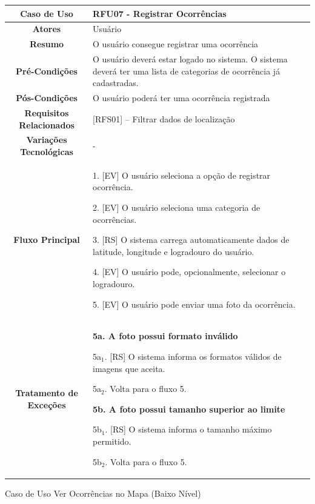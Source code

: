 \begin{apendicesenv}
\begin{quadro}[htb]
	\begin{tabular}{|c|p{11cm}|}
		\hline
		\textbf{Caso de Uso} & RFU07 - Registrar Ocorrências \\ \hline
		\textbf{Atores} & Usuário \\ \hline
		\textbf{Resumo} & O usuário consegue registrar uma ocorrência \\ \hline
		\textbf{Pré-Condições} & O usuário deverá estar logado no sistema. O sistema deverá ter uma lista de categorias de ocorrência já cadastradas. \\ \hline
		\textbf{Pós-Condições} & O usuário poderá ter uma ocorrência registrada \\ \hline
		\textbf{Requisitos Relacionados} & [RFS01] -- Filtrar dados de localização \\ \hline
		\textbf{Variações Tecnológicas} & - \\ \hline
		
		\textbf{Fluxo Principal} &
		\parbox[t]{11cm}{
			\raggedright
			1. [EV] O usuário seleciona a opção de registrar ocorrência.\par
			2. [EV] O usuário seleciona uma categoria de ocorrências.\par
			3. [RS] O sistema carrega automaticamente dados de latitude, longitude e logradouro do usuário.\par
			4. [EV] O usuário pode, opcionalmente, selecionar o logradouro.\par
			5. [EV] O usuário pode enviar uma foto da ocorrência.
		}
		\\ \hline
		
		\textbf{Tratamento de Exceções} &
		\parbox[t]{11cm}{
			\raggedright
			\textbf{5a. A foto possui formato inválido}\par
			5a$_1$. [RS] O sistema informa os formatos válidos de imagens que aceita.\par
			5a$_2$. Volta para o fluxo 5.\par
			
			\textbf{5b. A foto possui tamanho superior ao limite}\par
			5b$_1$. [RS] O sistema informa o tamanho máximo permitido.\par
			5b$_2$. Volta para o fluxo 5.
		}
		\\ \hline
	\end{tabular}
	
\end{quadro}

\begin{quadro}[htb]
	\centering
	\caption{\label{quadro_rfu08}Caso de Uso Ver Ocorrências no Mapa (Baixo Nível)}
	\small
	\renewcommand{\arraystretch}{1.1}
	

\end{quadro}
\end{apendicesenv}

